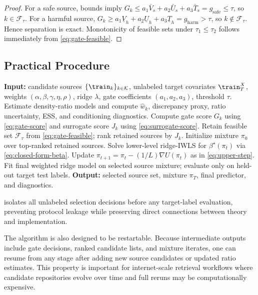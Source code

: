 \documentclass{article} %
\begin{document}
\begin{proof}
For a safe source, bounds imply
\(G_k\le a_1\bar V_s+a_2\bar U_s+a_3\bar T_s=g_{\mathrm{safe}}\le\tau\), so \(k\in\mathcal{F}_\tau\).
For a harmful source,
\(G_k\ge a_1\underline V_h+a_2\underline U_h+a_3\underline T_h=g_{\mathrm{harm}}>\tau\), so \(k\notin\mathcal{F}_\tau\).
Hence separation is exact. Monotonicity of feasible sets under \(\tau_1\le\tau_2\) follows immediately from \eqref{eq:gate-feasible}.
\end{proof}

\subsection{Practical Procedure}
\begin{algorithm}[t]
\caption{Stability-aware bilevel source selection without target labels}
\label{alg:stability-bilevel}
\begin{algorithmic}[1]
\STATE \textbf{Input:} candidate sources \(\{\train_k\}_{k\in\mathcal{K}}\), unlabeled target covariates \(\train_T^X\), weights \((\alpha,\beta,\gamma,\eta,\rho)\), ridge \(\lambda\), gate coefficients \((a_1,a_2,a_3)\), threshold \(\tau\).
\STATE Estimate density-ratio models and compute \(\hat w_k\), discrepancy proxy, ratio uncertainty, ESS, and conditioning diagnostics.
\STATE Compute gate score \(G_k\) using \eqref{eq:gate-score} and surrogate score \(J_k\) using \eqref{eq:surrogate-score}.
\ENDFOR
\STATE Retain feasible set \(\mathcal{F}_\tau\) from \eqref{eq:gate-feasible}; rank retained sources by \(J_k\).
\STATE Initialize mixture \(\pi_0\) over top-ranked retained sources.
\STATE Solve lower-level ridge-IWLS for \(\beta^{\star}(\pi_t)\) via \eqref{eq:closed-form-beta}.
\STATE Update \(\pi_{t+1}=\pi_t-(1/L)\nabla U(\pi_t)\) as in \eqref{eq:upper-step}.
\ENDFOR
\STATE Fit final weighted ridge model on selected source mixture; evaluate only on held-out target test labels.
\STATE \textbf{Output:} selected source set, mixture \(\pi_T\), final predictor, and diagnostics.
\end{algorithmic}
\end{algorithm}

 isolates all unlabeled selection decisions before any target-label evaluation, preventing protocol leakage while preserving direct connections between theory and implementation.

The algorithm is also designed to be restartable. Because intermediate outputs include gate decisions, ranked candidate lists, and mixture iterates, one can resume from any stage after adding new source candidates or updated ratio estimates. This property is important for internet-scale retrieval workflows where candidate repositories evolve over time and full reruns may be computationally expensive.
\end{document}
